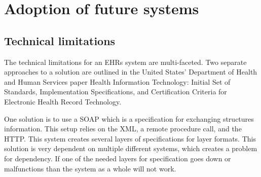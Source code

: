 \documentclass[14pt]{article}
\begin{document}
\newpage

\section{Adoption of future systems}
\label{sec:Future}

\subsection{Technical limitations}







The technical limitations for an \glspl{EHR} system are multi-faceted. Two separate approaches to a solution are outlined in the United States’ Department of Health and Human Services paper Health Information Technology: Initial Set of Standards, Implementation Specifications, and Certification Criteria for Electronic Health Record Technology. \cite{AMA} 

One solution is to use a \gls{SOAP} which is a specification for exchanging structures information. This setup relies on the \gls{XML}, a remote procedure call, and the \gls{HTTP}. This system creates several layers of specifications for layer formats. This solution is very dependent on multiple different systems, which creates a problem for dependency. If one of the needed layers for specification goes down or malfunctions than the system as a whole will not work. 
\end{document}
